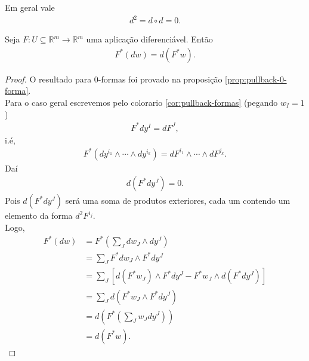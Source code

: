 \begin{proposition}
  Em geral vale
  \begin{align*}
    d^{2}=d\circ d=0.
  \end{align*}
\end{proposition}
\begin{proposition}
  Seja $F:U\subseteq \mathbb{R}^{m}\to\mathbb{R}^{m}$ uma aplicação diferenciável. Então
  \begin{align*}
    F^{\ast}(dw)=d(F^{\ast}w).
  \end{align*}
\end{proposition}
\begin{proof} 
  O resultado para $0$-formas foi provado na proposição \ref{prop:pullback-0-forma}.\\
  Para o caso geral escrevemos pelo colorario \ref{cor:pullback-formas} (pegando $w_I=1$)
  \begin{align*}
    F^{\ast}dy^{I}=dF^{J},
  \end{align*}
  i.é,
  \begin{align*}
    F^{\ast}\left( dy^{i_1}\wedge\cdots\wedge dy^{i_k} \right)=dF^{i_1}\wedge\cdots\wedge dF^{j_k}.
  \end{align*}
  Daí
  \begin{align*}
    d(F^{\ast}dy^{J})=0.
  \end{align*}
  Pois $d(F^{\ast}dy^{J})$ será uma soma de produtos exteriores, cada um contendo um elemento da forma $d^{2}F^{i_j}$.\\
  Logo,
  \begin{align*}
    F^{\ast}(dw)&=F^{\ast}\left( \sum_{J}dw_J\wedge dy^{J} \right)\\
    &=\sum_{J}F^{\ast}dw_{J}\wedge F^{\ast}dy^{J}\\
    &=\sum_{J}\left[ d(F^{\ast}w_J)\wedge F^{\ast}dy^{J}-F^{\ast}w_J\wedge d(F^{\ast}dy^{J}) \right]\\
    &=\sum_{J}d\left( F^{\ast}w_J\wedge F^{\ast}dy^{J} \right)\\
    &=d\left( F^{\ast}\left( \sum_{J}w_Jdy^{J} \right) \right)\\
    &=d(F^{\ast}w).
  \end{align*}
\end{proof}
